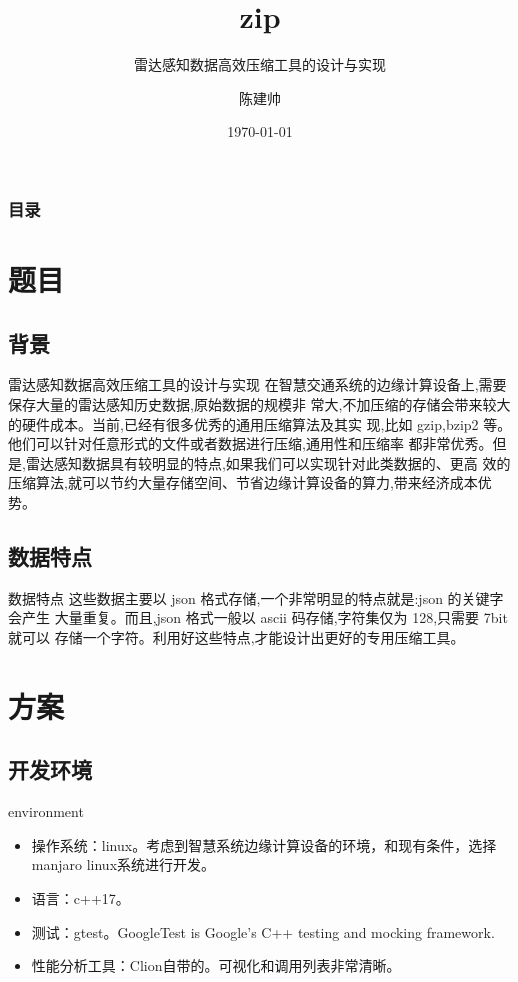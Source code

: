 \documentclass[10pt]{ctexbeamer}
\title{zip}
\subtitle{雷达感知数据高效压缩工具的设计与实现}
\date{\today}
\author{陈建帅}
\institute{BUPT}
\begin{document}


\begin{frame}           %
    \addtocounter{framenumber}{-2}%
    \frametitle{目录}
    \thispagestyle{empty}
    \tableofcontents        %
\end{frame}

\section{题目}
\subsection{背景}
\begin{frame}{雷达感知数据高效压缩工具的设计与实现}
  在智慧交通系统的边缘计算设备上,需要保存大量的雷达感知历史数据,原始数据的规模非
常大,不加压缩的存储会带来较大的硬件成本。当前,已经有很多优秀的通用压缩算法及其实
现,比如 gzip,bzip2 等。他们可以针对任意形式的文件或者数据进行压缩,通用性和压缩率
都非常优秀。但是,雷达感知数据具有较明显的特点,如果我们可以实现针对此类数据的、更高
效的压缩算法,就可以节约大量存储空间、节省边缘计算设备的算力,带来经济成本优势。
\end{frame}
\subsection{数据特点}
\begin{frame}{数据特点}
  这些数据主要以 json 格式存储,一个非常明显的特点就是:json 的关键字会产生
大量重复。而且,json 格式一般以 ascii 码存储,字符集仅为 128,只需要 7bit 就可以
存储一个字符。利用好这些特点,才能设计出更好的专用压缩工具。
\end{frame}
\section{方案}
\subsection{开发环境}
\begin{frame}{environment}
  \begin{itemize}
    \item 操作系统：linux。考虑到智慧系统边缘计算设备的环境，和现有条件，选择manjaro linux系统进行开发。
    \item 语言：c++17。
    \item 测试：gtest。GoogleTest is Google’s C++ testing and mocking framework. 
    \item 性能分析工具：Clion自带的。可视化和调用列表非常清晰。
  \end{itemize}
\end{frame}
\end{document}
